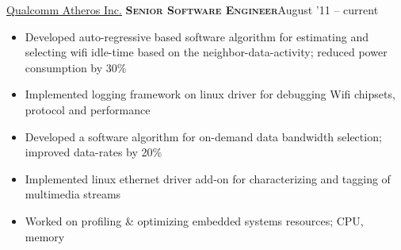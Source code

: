 \documentclass[10pt,a4paper]{article} %
\begin{document}

\headedsection %
{\href{http://www.qca.qualcomm.com}{Qualcomm Atheros Inc.}}
{\textsc{\textbf{Senior Software Engineer}}}{August '11 -- current}
\bodytext
  {\begin{itemize}
	\item Developed auto-regressive based software algorithm for estimating and selecting wifi idle-time based on the neighbor-data-activity; reduced power consumption by 30\% 
	\item Implemented logging framework on linux driver for debugging Wifi chipsets, protocol and performance
	\item Developed a software algorithm for on-demand data bandwidth selection; improved data-rates by 20\%
	\item Implemented linux ethernet driver add-on for characterizing and tagging of multimedia streams%
	\item Worked on profiling \& optimizing embedded systems resources; CPU, memory
\end{itemize}}

%

\end{document}

